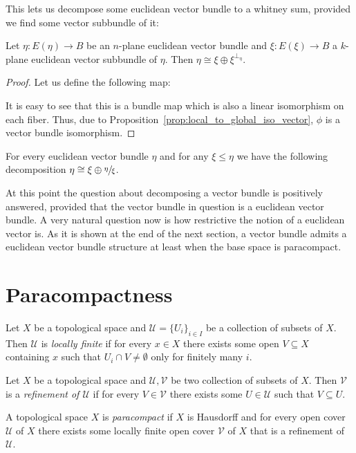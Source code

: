 This lets us decompose some euclidean vector bundle to a whitney sum, provided we find some vector subbundle of it:
\begin{lemma} Let $\eta:E(\eta)\to B$ be an $n$-plane euclidean vector bundle and $\xi:E(\xi)\to B$ a $k$-plane euclidean vector subbundle of $\eta$. Then $\eta\cong\xi\oplus\xi^{\perp_{\eta}}$.
\end{lemma}
\begin{proof} Let us define the following map:
\begin{center}
\end{center}
It is easy to see that this is a bundle map which is also a linear isomorphism on each fiber. Thus, due to Proposition~\ref{prop:local_to_global_iso_vector}, $\phi$ is a vector bundle isomorphism.
\end{proof}
\begin{remark} For every euclidean vector bundle $\eta$ and for any $\xi\leq\eta$ we have the following decomposition $\eta\cong\xi\oplus\sfrac{\eta}{\xi}$.
\end{remark}

At this point the question about decomposing a vector bundle is positively answered, provided that the vector bundle in question is a euclidean vector bundle. A very natural question now is how restrictive the notion of a euclidean vector is. As it is shown at the end of the next section, a vector bundle admits a euclidean vector bundle structure at least when the base space is paracompact.

\section{Paracompactness}
\begin{definition} Let $X$ be a topological space and $\mathcal{U}=\{U_i\}_{i\in I}$ be a collection of subsets of $X$. Then $\mathcal{U}$ is \emph{locally finite} if for every $x\in X$ there exists some open $V\subseteq X$ containing $x$ such that $U_i\cap V\neq\emptyset$ only for finitely many $i$.
\end{definition}
\begin{definition} Let $X$ be a topological space and $\mathcal{U},\mathcal{V}$ be two collection of subsets of $X$. Then $\mathcal{V}$ is a \emph{refinement of $\mathcal{U}$} if for every $V\in\mathcal{V}$ there exists some $U\in\mathcal{U}$ such that $V\subseteq U$.
\end{definition}
\begin{definition} A topological space $X$ is \emph{paracompact} if $X$ is Hausdorff and for every open cover $\mathcal{U}$ of $X$ there exists some locally finite open cover $\mathcal{V}$ of $X$ that is a refinement of $\mathcal{U}$.
\end{definition}

